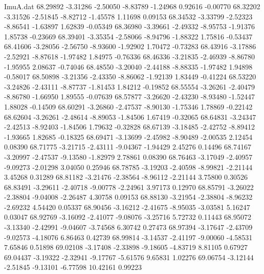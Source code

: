 \begin{filecontents}{ImuA.dat}
  68.29892   -3.31286   -2.50050   -8.83789   -1.24968    0.92616   -0.00770
  68.32202   -3.31526   -2.51845   -8.82712   -1.45578    1.11698    0.09153
  68.34532   -3.33799   -2.52323   -8.86541   -1.63897    1.62839   -0.05349
  68.36980   -3.39661   -2.49332   -8.95753   -1.91376    1.85738   -0.23669
  68.39401   -3.35354   -2.58066   -8.94796   -1.88322    1.75816   -0.53437
  68.41606   -3.28056   -2.56750   -8.93600   -1.92902    1.70472   -0.73283
  68.43916   -3.17886   -2.52921   -8.87618   -1.97482    1.84975   -0.76336
  68.46336   -3.21835   -2.46939   -8.86780   -1.95955    2.08637   -0.74046
  68.48550   -3.20040   -2.44188   -8.88335   -1.97482    1.94898   -0.58017
  68.50898   -3.21356   -2.43350   -8.86062   -1.92139    1.83449   -0.41224
  68.53220   -3.24826   -2.43111   -8.87737   -1.81453    1.84212   -0.19852
  68.55554   -3.26261   -2.40479   -8.86780   -1.66950    1.89555   -0.07639
  68.57877   -3.26620   -2.43230   -8.93480   -1.52447    1.88028   -0.14509
  68.60291   -3.26860   -2.47537   -8.90130   -1.75346    1.78869   -0.22142
  68.62604   -3.26261   -2.48614   -8.89053   -1.84506    1.67419   -0.32065
  68.64831   -3.24347   -2.42513   -8.92403   -1.84506    1.79632   -0.32828
  68.67139   -3.18485   -2.42752   -8.89412   -1.93665    1.82685   -0.18325
  68.69471   -3.13699   -2.45982   -8.90489   -2.00535    2.12454    0.08390
  68.71775   -3.21715   -2.43111   -9.04367   -1.94429    2.45276    0.14496
  68.74167   -3.20997   -2.47537   -9.13580   -1.82979    2.78861    0.08390
  68.76463   -3.17049   -2.40957   -9.09273   -2.01298    3.04050    0.25946
  68.78785   -3.19203   -2.40598   -8.99821   -2.21144    3.45268    0.31289
  68.81182   -3.21476   -2.38564   -8.96112   -2.21144    3.75800    0.30526
  68.83491   -3.29611   -2.40718   -9.00778   -2.24961    3.97173    0.12970
  68.85791   -3.26022   -2.38804   -9.04008   -2.26487    4.30758    0.09153
  68.88130   -3.21954   -2.38804   -8.96232   -2.69232    4.54420    0.05337
  68.90456   -3.16212   -2.41675   -8.95035   -3.03581    5.16247    0.03047
  68.92769   -3.16092   -2.41077   -9.08076   -3.25716    5.72732    0.11443
  68.95072   -3.13340   -2.42991   -9.04607   -3.74568    6.30742    0.27473
  68.97394   -3.17647   -2.43709   -9.02573   -4.18076    6.86463    0.42739
  68.99814   -3.14537   -2.41197   -9.00060   -4.58531    7.65846    0.51898
  69.02108   -3.17408   -2.33898   -9.18605   -4.83719    8.81105    0.67927
  69.04437   -3.19322   -2.32941   -9.17767   -5.61576    9.65831    1.02276
  69.06754   -3.12144   -2.51845   -9.13101   -6.77598   10.42161    0.99223

\end{filecontents}

